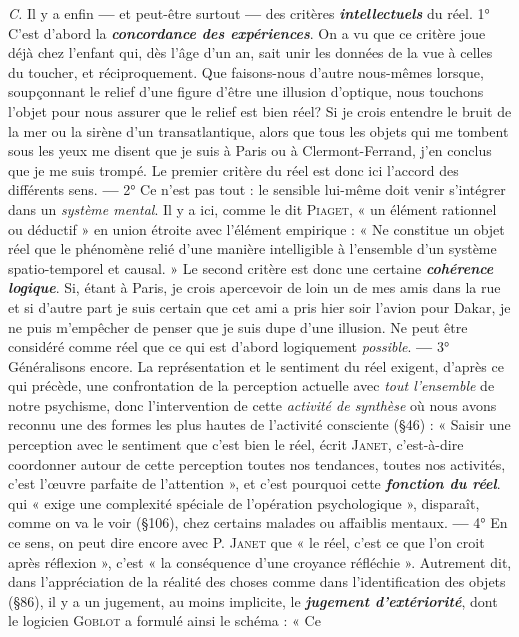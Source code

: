 {\it C.} Il y a enfin {\bf —} et peut-être surtout {\bf —} des critères \textbf{\textit {intellectuels}}
du réel. 1° C’est d’abord la \textbf{\textit {concordance des expériences}}. On a vu
que ce critère joue déjà chez l’enfant qui, dès l’âge d’un an, sait unir
les données de la vue à celles du toucher, et réciproquement. Que
faisons-nous d’autre nous-mêmes lorsque, soupçonnant le relief d’une
figure d’être une illusion d’optique, nous touchons l’objet pour nous
assurer que le relief est bien réel? Si je crois entendre le bruit de la
mer ou la sirène d’un transatlantique, alors que tous les objets qui
me tombent sous les yeux me disent que je suis à Paris ou à Clermont-Ferrand,
j'en conclus que je me suis trompé. Le premier critère du
réel est donc ici l’accord des différents sens. {\bf —} 2° Ce n’est pas tout :
le sensible lui-même doit venir s'intégrer dans un {\it système mental}. Il
y a ici, comme le dit \textsc{Piaget}, « un élément rationnel ou déductif »
en union étroite avec l’élément empirique : « Ne constitue un objet
réel que le phénomène relié d’une manière intelligible à l’ensemble
d’un système spatio-temporel et causal. » Le second critère est donc
une certaine \textbf{\textit {cohérence logique}}. Si, étant à Paris, je crois apercevoir
de loin un de mes amis dans la rue et si d'autre part je suis certain
que cet ami a pris hier soir l'avion pour Dakar, je ne puis m'empêcher
de penser que je suis dupe d’une illusion. Ne peut être considéré
comme réel que ce qui est d’abord logiquement {\it possible}. {\bf —} 3° Généralisons
encore. La représentation et le sentiment du réel exigent,
d’après ce qui précède, une confrontation de la perception actuelle
avec {\it tout l’ensemble} de notre psychisme, donc l’intervention de cette
{\it activité de synthèse} où nous avons reconnu une des formes les plus
hautes de l'activité consciente (\S 46) : « Saisir une perception avec le
sentiment que c’est bien le réel, écrit \textsc{Janet}, c’est-à-dire coordonner
autour de cette perception toutes nos tendances, toutes nos activités,
c’est l'œuvre parfaite de l’attention », et c’est pourquoi cette \textbf{\textit {fonction
du réel}}. qui « exige une complexité spéciale de l’opération psychologique »,
disparaît, comme on va le voir (\S 106), chez certains malades
ou affaiblis mentaux. {\bf —} 4° En ce sens, on peut dire encore avec
P. \textsc{Janet} que « le réel, c’est ce que l’on croit après réflexion », c’est
« la conséquence d’une croyance réfléchie ». Autrement dit, dans l’appréciation
de la réalité des choses comme dans l'identification des
objets (\S 86), il y a un jugement, au moins implicite, le \textbf{\textit {jugement
d’extériorité}}, dont le logicien \textsc{Goblot} a formulé ainsi le schéma : « Ce
